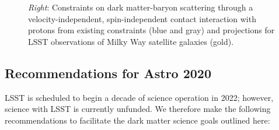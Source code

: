 \documentclass[12pt]{article}
\begin{document}
\begin{figure}[t]
{    %
    \emph{Right}: Constraints on dark matter-baryon scattering through a velocity-independent, spin-independent contact interaction with protons from existing constraints (blue and gray) and projections for LSST observations of Milky Way satellite galaxies (gold).
}
\end{figure}

\vspace{-1em} \subsection*{Recommendations for Astro 2020} \vspace{-0.5em}

LSST is scheduled to begin a decade of science operation in 2022; however, science with LSST is currently unfunded.
We therefore make the following recommendations to facilitate the dark matter science goals outlined here:
\end{document}
